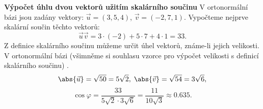 \begin{mdframed}[style=mdexam]
  \begin{example}\label{mai:exam108}
    \textbf{Výpočet úhlu dvou vektorů užitím skalárního součinu}\newline
    V ortonormální bázi jsou zadány vektory: \(\vec{u}=(3,5,4)\), \(\vec{v}=(-2,7,1)\). Vypočteme
    nejprve skalární součin těchto vektorů:
    \begin{equation*}
      \vec{u}\vec{v} = 3\cdot(-2) + 5\cdot7 + 4\cdot1 = 33.
    \end{equation*}
    Z definice skalárního součinu můžeme určit úhel vektorů, známe-li jejich velikosti. V
    ortonormální bázi (všimněme si souhlasu vzorce pro výpočet velikosti s definicí skalárního
    součinu) \cite[s.~27]{Musilova2012MA2}.
    \begin{equation*}
      \abs{\vec{u}} = \sqrt{50} = 5\sqrt{2},\; \abs{\vec{v}} = \sqrt{54} = 3\sqrt{6},
    \end{equation*}    
    \begin{equation*}
      \cos\varphi = \dfrac{33}{5\sqrt{2}\cdot3\sqrt{6}} = \dfrac{11}{10\sqrt{3}}\approx\num{0.635}.
    \end{equation*}
    {\centering
      \captionsetup{type=figure}
      \label{mai:fig077}
    \par}
  \end{example}
\end{mdframed}